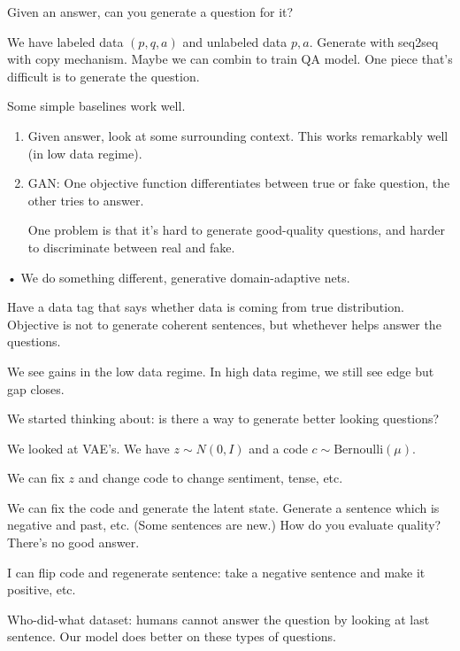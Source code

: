 Given an answer, can you generate a question for it?

We have labeled data $(p,q,a)$ and unlabeled data $p,a$. Generate with seq2seq with copy mechanism. Maybe we can combin to train QA model. One piece that's difficult is to generate the question.

Some simple baselines work well. 
\begin{enumerate}
\item
Given answer, look at some surrounding context. This works remarkably well (in low data regime). 
\item
GAN: One objective function differentiates between true or fake question, the other tries to answer.

One problem is that it's hard to generate good-quality questions, and harder to discriminate between real and fake.
\end{enumerate}•
We do something different, generative domain-adaptive nets. 

Have a data tag that says whether data is coming from true distribution. %
Objective is not to generate coherent sentences, but whethever helps answer the questions. 

We see gains in the low data regime. In high data regime, we still see edge but gap closes. 

We started thinking about: is there a way to generate better looking questions? 

We looked at VAE's. We have $z\sim N(0,I)$ and a code $c\sim \text{Bernoulli}(\mu)$.

We can fix $z$ and change code to change sentiment, tense, etc.

We can fix the code and generate the latent state. Generate a sentence which is negative and past, etc.
(Some sentences are new.) 
How do you evaluate quality? There's no good answer.

I can flip code and regenerate sentence: take a negative sentence and make it positive, etc.


Who-did-what dataset: humans cannot answer the question by  looking at last sentence. Our model does better on these types of questions. 